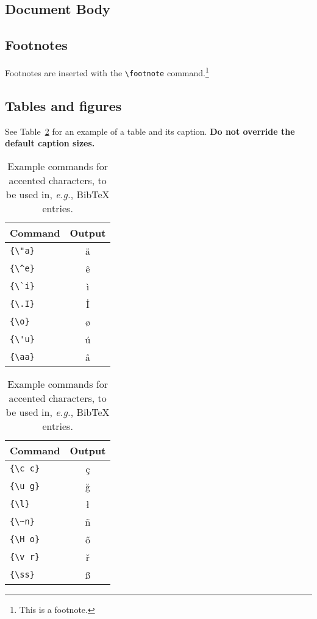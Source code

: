 \documentclass[11pt]{article}
\begin{document}
\subsection{Document Body}

\subsection{Footnotes}

Footnotes are inserted with the \verb|\footnote| command.\footnote{This is a footnote.}

\subsection{Tables and figures}

See Table~\ref{tab:accents} for an example of a table and its caption.
\textbf{Do not override the default caption sizes.}

\begin{table}
	\centering
	\begin{tabular}{lc}
		\hline
		\textbf{Command} & \textbf{Output}\\
		\hline
		\verb|{\"a}| & {\"a} \\
		\verb|{\^e}| & {\^e} \\
		\verb|{\`i}| & {\`i} \\ 
		\verb|{\.I}| & {\.I} \\ 
		\verb|{\o}| & {\o} \\
		\verb|{\'u}| & {\'u}  \\ 
		\verb|{\aa}| & {\aa}  \\\hline
	\end{tabular}
	\begin{tabular}{lc}
		\hline
		\textbf{Command} & \textbf{Output}\\
		\hline
		\verb|{\c c}| & {\c c} \\ 
		\verb|{\u g}| & {\u g} \\ 
		\verb|{\l}| & {\l} \\ 
		\verb|{\~n}| & {\~n} \\ 
		\verb|{\H o}| & {\H o} \\ 
		\verb|{\v r}| & {\v r} \\ 
		\verb|{\ss}| & {\ss} \\
		\hline
	\end{tabular}
	\caption{Example commands for accented characters, to be used in, \emph{e.g.}, Bib\TeX{} entries.}
	\label{tab:accents}
\end{table}
\end{document}
